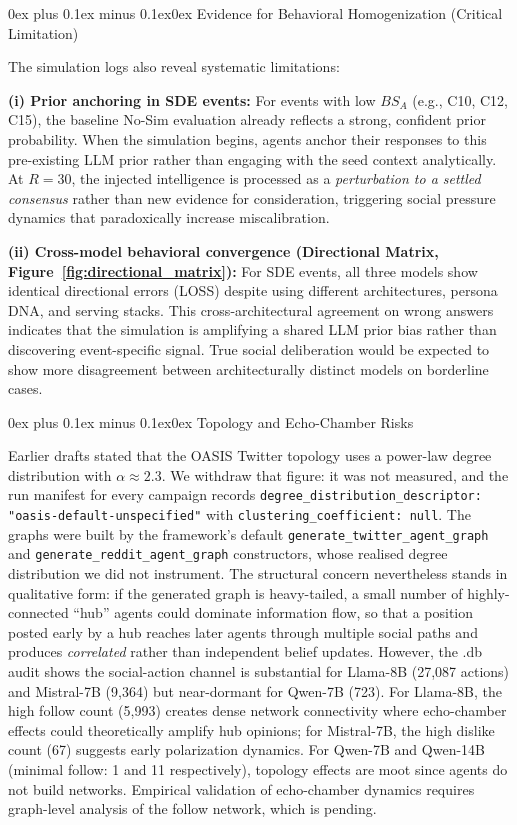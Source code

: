 \documentclass[11pt,journal,onecolumn]{IEEEtran}
\makeatletter
\renewcommand\subsubsection{\@startsection{subsubsection}{3}{\parindent}%
  {0ex plus 0.1ex minus 0.1ex}{0ex}%
  {\normalfont\normalsize\bfseries\itshape}}
\makeatother
\begin{document}
\subsubsection{Evidence for Behavioral Homogenization (Critical Limitation)}

The simulation logs also reveal systematic limitations:

\textbf{(i) Prior anchoring in SDE events:} For events with low $BS_A$ (e.g., C10, C12, C15), the baseline No-Sim evaluation already reflects a strong, confident prior probability. When the simulation begins, agents anchor their responses to this pre-existing LLM prior rather than engaging with the seed context analytically. At $R=30$, the injected intelligence is processed as a \emph{perturbation to a settled consensus} rather than new evidence for consideration, triggering social pressure dynamics that paradoxically increase miscalibration.

\textbf{(ii) Cross-model behavioral convergence (Directional Matrix, Figure~\ref{fig:directional_matrix}):} For SDE events, all three models show identical directional errors (LOSS) despite using different architectures, persona DNA, and serving stacks. This cross-architectural agreement on wrong answers indicates that the simulation is amplifying a shared LLM prior bias rather than discovering event-specific signal. True social deliberation would be expected to show more disagreement between architecturally distinct models on borderline cases.

\subsubsection{Topology and Echo-Chamber Risks}

Earlier drafts stated that the OASIS Twitter topology uses a power-law degree distribution with $\alpha \approx 2.3$. We withdraw that figure: it was not measured, and the run manifest for every campaign records \texttt{degree\_distribution\_descriptor: "oasis-default-unspecified"} with \texttt{clustering\_coefficient: null}. The graphs were built by the framework's default \texttt{generate\_twitter\_agent\_graph} and \texttt{generate\_reddit\_agent\_graph} constructors, whose realised degree distribution we did not instrument. The structural concern nevertheless stands in qualitative form: if the generated graph is heavy-tailed, a small number of highly-connected ``hub'' agents could dominate information flow, so that a position posted early by a hub reaches later agents through multiple social paths and produces \emph{correlated} rather than independent belief updates. However, the .db audit shows the social-action channel is substantial for Llama-8B (27,087 actions) and Mistral-7B (9,364) but near-dormant for Qwen-7B (723). For Llama-8B, the high follow count (5,993) creates dense network connectivity where echo-chamber effects could theoretically amplify hub opinions; for Mistral-7B, the high dislike count (67) suggests early polarization dynamics. For Qwen-7B and Qwen-14B (minimal follow: 1 and 11 respectively), topology effects are moot since agents do not build networks. Empirical validation of echo-chamber dynamics requires graph-level analysis of the follow network, which is pending.
\end{document}
